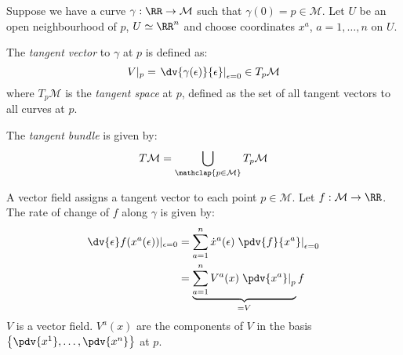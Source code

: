 \documentclass{jknotes}
\begin{document}
Suppose we have a curve \(\gamma:\RR\rightarrow\mathcal{M}\) such that \(\gamma(0) = p \in \mathcal{M}\). Let \(U\) be an open neighbourhood of \(p\), \(U\simeq\RR^n\) and choose coordinates \(x^a\), \(a = 1,\dots,n\) on \(U\).

\begin{defn}
    The \emph{tangent vector} to \(\gamma\) at \(p\) is defined as:
    \begin{equation}
        V|_p = \left.\dv{\gamma(\epsilon)}{\epsilon}\right|_{\epsilon=0}\in T_p\mathcal{M}
    \end{equation}
    where \(T_p\mathcal{M}\) is the \emph{tangent space} at \(p\), defined as the set of all tangent vectors to all curves at \(p\).
    \begin{figure}[H]
        \centering
    \end{figure}
\end{defn}

\begin{defn}
    The \emph{tangent bundle} is given by:
    \begin{equation}
        T\mathcal{M} = \bigcup_{\mathclap{p\in\mathcal{M}}} T_p\mathcal{M}
    \end{equation}
\end{defn}

A vector field assigns a tangent vector to each point \(p\in\mathcal{M}\). Let \(f:\mathcal{M}\rightarrow\RR\). The rate of change of \(f\) along \(\gamma\) is given by:
\begin{align}
    \dv{\epsilon}f(x^a(\epsilon))|_{\epsilon=0} &= \sum_{a=1}^n \dot{x}^a(\epsilon)\left.\pdv{f}{x^a}\right|_{\epsilon=0}\\
    &= \underbrace{\sum_{a=1}^nV^a(x)\left.\pdv{x^a}\right|_p}_{=V} f
\end{align}
\(V\) is a vector field. \(V^a(x)\) are the components of \(V\) in the basis \(\left\{\pdv{x^1},\dots,\pdv{x^n}\right\}\) at \(p\). 
\end{document}
